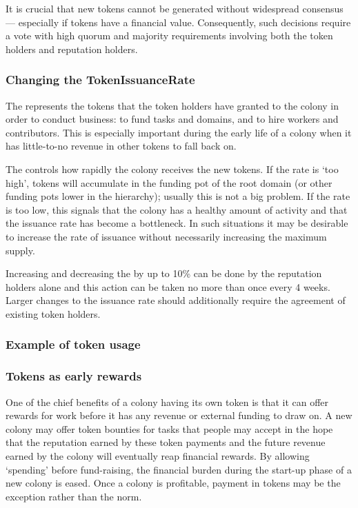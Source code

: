  It is crucial that new tokens cannot be generated without widespread consensus --- especially if tokens have a financial value. Consequently, such decisions require a vote with high quorum and majority requirements involving both the token holders and reputation holders.

\subsubsection*{Changing the TokenIssuanceRate}

The  represents the tokens that the token holders have granted to the colony in order to conduct business: to fund tasks and domains, and to hire workers and contributors. This is especially important during the early life of a colony when it has little-to-no revenue in other tokens to fall back on.

The  controls how rapidly the colony receives the new tokens. If the rate is `too high', tokens will accumulate in the funding pot of the root domain (or other funding pots lower in the hierarchy); usually this is not a big problem. If the rate is too low, this signals that the colony has a healthy amount of activity and that the issuance rate has become a bottleneck. In such situations it may be desirable to increase the rate of issuance without necessarily increasing the maximum supply.

Increasing and decreasing the  by up to 10\% can be done by the reputation holders alone and this action can be taken no more than once every 4 weeks. Larger changes to the issuance rate should additionally require the agreement of existing token holders.

\subsubsection{Example of token usage}\label{sec:colony-token-examples}

\subsubsection*{Tokens as early rewards}

One of the chief benefits of a colony having its own token is that it can offer rewards for work before it has any revenue or external funding to draw on.
A new colony may offer token bounties for tasks that people may accept in the hope that the reputation earned by these token payments and the future revenue earned by the colony will eventually reap financial rewards. By allowing `spending' before fund-raising, the financial burden during the start-up phase of a new colony is eased. Once a colony is profitable, payment in tokens may be the exception rather than the norm.

